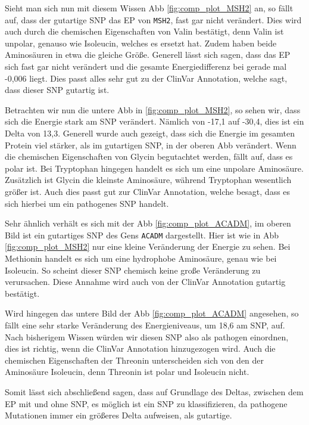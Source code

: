 Sieht man sich nun mit diesem Wissen \ac{Abb} \ref{fig:comp_plot_MSH2} an, so fällt auf, dass der gutartige \ac{SNP} das \ac{EP} von \texttt{MSH2}, fast gar nicht verändert. Dies wird auch durch die chemischen Eigenschaften von Valin bestätigt, denn Valin ist unpolar, genauso wie Isoleucin, welches es ersetzt hat. Zudem haben beide Aminosäuren in etwa die gleiche Größe. Generell lässt sich sagen, dass das \ac{EP} sich fast gar nicht verändert und die gesamte Energiedifferenz bei gerade mal -0,006 liegt. Dies passt alles sehr gut zu der ClinVar Annotation, welche sagt, dass dieser \ac{SNP} gutartig ist.

Betrachten wir nun die untere \ac{Abb} in \ref{fig:comp_plot_MSH2}, so sehen wir, dass sich die Energie stark am \ac{SNP} verändert. Nämlich von -17,1 auf -30,4, dies ist ein Delta von 13,3. Generell wurde auch gezeigt, dass sich die Energie im gesamten Protein viel stärker, als im gutartigen \ac{SNP}, in der oberen \ac{Abb} verändert. Wenn die chemischen Eigenschaften von Glycin begutachtet werden, fällt auf, dass es polar ist. Bei Tryptophan hingegen handelt es sich um eine unpolare Aminosäure. Zusätzlich ist Glycin die kleinste Aminosäure, während Tryptophan wesentlich größer ist. Auch dies passt gut zur ClinVar Annotation, welche besagt, dass es sich hierbei um ein pathogenes \ac{SNP} handelt.

Sehr ähnlich verhält es sich mit der \ac{Abb} \ref{fig:comp_plot_ACADM}, im oberen Bild ist ein gutartiges \ac{SNP} des Gens \texttt{ACADM} dargestellt. Hier ist wie in \ac{Abb} \ref{fig:comp_plot_MSH2} nur eine kleine Veränderung der Energie zu sehen. Bei Methionin handelt es sich um eine hydrophobe Aminosäure, genau wie bei Isoleucin. So scheint dieser \ac{SNP} chemisch keine große Veränderung zu verursachen. Diese Annahme wird auch von der ClinVar Annotation gutartig bestätigt. 

Wird hingegen das untere Bild der \ac{Abb} \ref{fig:comp_plot_ACADM} angesehen, so fällt eine sehr starke Veränderung des Energieniveaus, um 18,6 am \ac{SNP}, auf. Nach bisherigem Wissen würden wir diesen \ac{SNP} also als pathogen einordnen, dies ist richtig, wenn die ClinVar Annotation hinzugezogen wird. Auch die chemischen Eigenschaften der Threonin unterscheiden sich von den der Aminosäure Isoleucin, denn Threonin ist polar und Isoleucin nicht. 

Somit lässt sich abschließend sagen, dass auf Grundlage des Deltas, zwischen dem \ac{EP} mit und ohne \ac{SNP}, es möglich ist ein \ac{SNP} zu klassifizieren, da pathogene Mutationen immer ein größeres Delta aufweisen, als gutartige.


